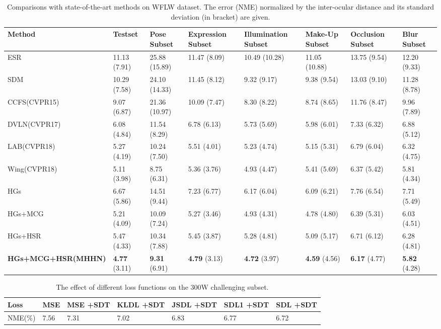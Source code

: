 \documentclass[journal]{IEEEtran}
\begin{document}
\begin{table*}
	\caption{Comparisons with state-of-the-art methods on WFLW dataset. The error (NME) normalized by the inter-ocular distance and its standard deviation (in bracket) are given.}
	\begin{center}
		\begin{tabular}{p{3cm}p{1.5cm}p{1.6cm}p{1.5cm}p{1.6cm}p{1.6cm}p{1.5cm}p{1.5cm}}
			\hline
			Method & Testset  & Pose Subset  & Expression Subset &Illumination Subset &Make-Up Subset &Occlusion Subset & Blur Subset  \\
			\hline
			ESR\cite{cao2014face} &11.13 (7.91) &25.88 (15.89) &11.47 (8.09) &10.49 (10.28) &11.05 (10.88) &13.75 (9.54) &12.20 (9.33) \\
			SDM\cite{xiong2013supervised} &10.29 (7.58) &24.10 (14.33) &11.45 (8.12) &9.32 (9.17) &9.38 (9.54) &13.03 (9.10) &11.28 (8.78) \\
			CCFS(CVPR15)\cite{zhu2015face} &9.07 (6.87) &21.36 (10.97) &10.09 (7.47) &8.30 (8.22) &8.74 (8.65) &11.76 (8.47) &9.96 (7.89) \\
			DVLN(CVPR17)\cite{wu2017leveraging} &6.08 (4.84) &11.54 (8.29) &6.78 (6.13) &5.73 (5.69) &5.98 (6.01) &7.33 (6.32) &6.88 (5.12) \\
			LAB(CVPR18)\cite{Wu2018LookAB} &5.27 (4.19) &10.24 (7.50) &5.51 (4.01) &5.23 (4.74) &5.15 (5.31) &6.79 (6.04) &6.32 (4.75) \\
			Wing(CVPR18)\cite{Feng2017WingLF} &5.11 (3.98) &8.75 (6.31) &5.36 (3.76) &4.93 (4.47) &5.41 (5.69) &6.37 (5.42) &5.81 (4.34) \\			
			\hline
			HGs &6.67 (5.86) &14.51 (9.44) &7.23 (6.77) &6.17 (6.04) &6.09 (6.21) &7.76 (6.54) &7.71 (5.49) \\
			HGs+MCG &5.21 (4.09) &10.09 (7.24) &5.27 (3.46) &4.93 (4.31) &4.78 (4.80) &6.39 (5.31) &6.03 (4.51) \\
			HGs+HSR &5.47 (4.33) &10.34 (7.88) &5.45 (3.87) &5.28 (4.81) &5.09 (5.17) &6.71 (6.12) &6.28 (4.81) \\
			\textbf{HGs+MCG+HSR(MHHN)} &\textbf{4.77} (3.11) &\textbf{9.31} (6.91) &\textbf{4.79} (3.13) &\textbf{4.72} (3.97) &\textbf{4.59} (4.56) &\textbf{6.17} (4.77) &\textbf{5.82} (4.28)\\
			\hline
		\end{tabular}
	\end{center}
	\label{tabwflw}
\end{table*}
\begin{table}
	\caption{The effect of different loss functions on the 300W challenging subset.}
	\begin{center}
		\begin{tabular}{p{0.7cm}p{0.7cm}p{0.7cm}p{0.7cm}p{0.7cm}p{0.7cm}p{0.7cm}}
			\hline
			Loss & MSE & MSE  +SDT &KLDL +SDT &JSDL +SDT &  SDL1 +SDT & SDL +SDT \\
			\hline
			NME(\%) &	7.56&	7.31 & 7.02 & 6.83 &6.77 &6.72 \\
			\hline
		\end{tabular}
	\end{center}
	\label{tabloss}
\end{table}
\end{document}
